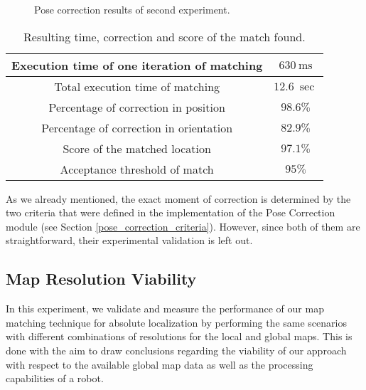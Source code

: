 \begin{figure}[h!]
    \centering
    \setlength\figureheight{8cm}
    \setlength\figurewidth{12cm}
    
    \caption[Pose correction error over time plot]{
        Pose correction results of second experiment.
    }
    \label{fig:pose_correction_error}
\end{figure}

\begin{table}[h!]
    \centering
    \begin{tabular}{| c | c |}
        \hline
        Execution time of one iteration of matching &
            $\SI{630}{\milli\second}$ \\
        \hline
        Total execution time of matching & $\SI{12.6}{\sec}$ \\
        \hline
        \hline
        Percentage of correction in position & $98.6\%$ \\
        \hline
        Percentage of correction in orientation & $82.9\%$ \\
        \hline
        \hline
        Score of the matched location & $97.1\%$ \\
        \hline
        Acceptance threshold of match & $95\%$ \\
        \hline
    \end{tabular}
    \caption[Results of pose correction for absolute localization]{
        Resulting time, correction and score of the match found.
    }
    \label{table:pose_correction}
\end{table}

As we already mentioned, the exact moment of correction is determined by
the two criteria that were defined in the implementation of the Pose Correction
module (see Section \ref{pose_correction_criteria}).
However, since both of them are straightforward, their experimental
validation is left out.

\subsection{Map Resolution Viability}

In this experiment, we validate and measure the performance of our map
matching technique for absolute localization by performing the same
scenarios with different combinations of resolutions for the local and
global maps.
This is done with the aim to draw conclusions regarding the viability
of our approach with respect to the available global map data as well as
the processing capabilities of a robot.


